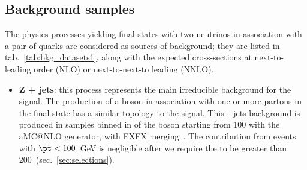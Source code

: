 \subsection{Background samples}\label{ssec:backgrounds}

The physics processes yielding final states with two neutrinos in association with a pair of quarks are considered as sources of background; they are listed in tab.~\ref{tab:bkg_datasets1}, along with the expected cross-sections at next-to-leading order (NLO) or next-to-next-to leading (NNLO).

\begin{itemize}
  \item {\bf Z + jets}: this process represents the main irreducible background for the signal. The production of a \Z boson in association with one or more partons in the final state has a similar topology to the signal. This \Z+jets background is produced in samples binned in \pt of the \Z boson starting from 100 \GeV with the {\sc aMC@NLO} generator, with FXFX merging~\cite{bib:FXFX}. The contribution from events with $\pt<100$~GeV is negligible after we require the \met to be greater than 200~\GeV (sec.~\ref{sec:selections}).


\end{itemize}
